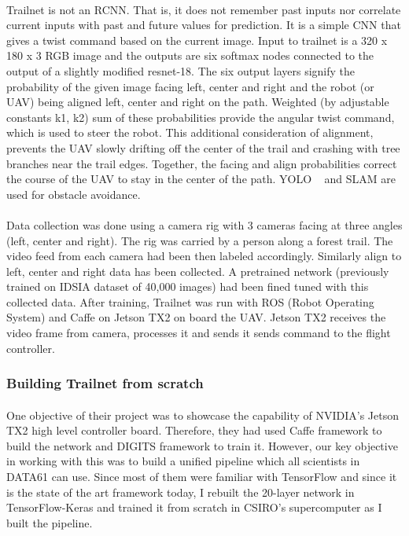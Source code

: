 \paragraph{}
Trailnet is not an RCNN. That is, it does not remember past inputs nor correlate current inputs with past and future values for prediction. It is a simple CNN that gives a twist command based on the current image. Input to trailnet is a 320 x 180 x 3 RGB image and the outputs are six softmax nodes connected to the output of a slightly modified resnet-18. The six output layers signify the probability of the given image facing left, center and right and the robot (or UAV) being aligned left, center and right on the path. Weighted (by adjustable constants k1, k2) sum of these probabilities provide the angular twist command, which is used to steer the robot. This additional consideration of alignment, prevents the UAV slowly drifting off the center of the trail and crashing with tree branches near the trail edges. Together, the facing and align probabilities correct the course of the UAV to stay in the center of the path. YOLO ~\cite{yolo} and SLAM are used for obstacle avoidance.

\paragraph{}
Data collection was done using a camera rig with 3 cameras facing at three angles (left, center and right). The rig was carried by a person along a forest trail. The video feed from each camera had been then labeled accordingly. Similarly align to left, center and right data has been collected. A pretrained network (previously trained on IDSIA dataset %
of 40,000 images) had been fined tuned with this collected data. After training, Trailnet was run with ROS (Robot Operating System) and Caffe on Jetson TX2 on board the UAV. Jetson TX2 receives the video frame from camera, processes it and sends it sends command to the flight controller. 



\subsubsection{Building Trailnet from scratch}

\paragraph{}
One objective of their project was to showcase the capability of NVIDIA's Jetson TX2 high level controller board. Therefore, they had used Caffe framework to build the network and DIGITS framework to train it. However, our key objective in working with this was to build a unified pipeline which all scientists in DATA61 can use. Since most of them were familiar with TensorFlow and since it is the state of the art framework today, I rebuilt the 20-layer network in TensorFlow-Keras and trained it from scratch in CSIRO's supercomputer as I built the pipeline.

